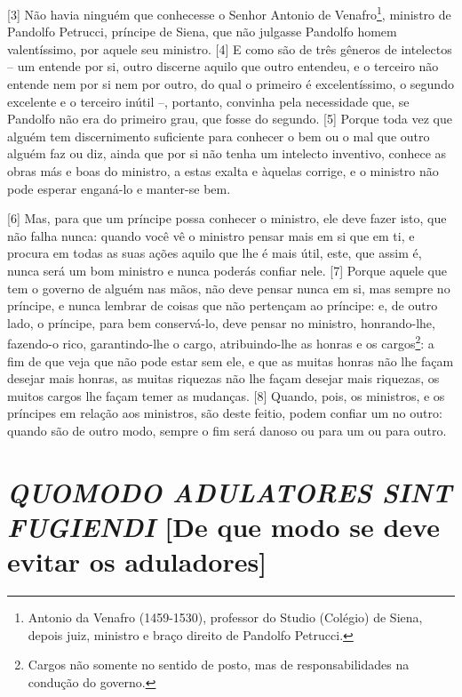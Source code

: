 {[}3{]} Não havia ninguém que conhecesse o Senhor Antonio de
Venafro\footnote{Antonio da Venafro (1459-1530), professor do Studio
  (Colégio) de Siena, depois juiz, ministro e braço direito de Pandolfo
  Petrucci.}, ministro de Pandolfo Petrucci, príncipe de Siena, que não
julgasse Pandolfo homem valentíssimo, por aquele seu ministro. {[}4{]} E
como são de três gêneros de intelectos -- um entende por si, outro
discerne aquilo que outro entendeu, e o terceiro não entende nem por si
nem por outro, do qual o primeiro é excelentíssimo, o segundo excelente
e o terceiro inútil --, portanto, convinha pela necessidade que, se
Pandolfo não era do primeiro grau, que fosse do segundo. {[}5{]} Porque
toda vez que alguém tem discernimento suficiente para conhecer o bem ou
o mal que outro alguém faz ou diz, ainda que por si não tenha um
intelecto inventivo, conhece as obras más e boas do ministro, a estas
exalta e àquelas corrige, e o ministro não pode esperar enganá-lo e
manter-se bem.

{[}6{]} Mas, para que um príncipe possa conhecer o ministro, ele deve
fazer isto, que não falha nunca: quando você vê o ministro pensar mais
em si que em ti, e procura em todas as suas ações aquilo que lhe é mais
útil, este, que assim é, nunca será um bom ministro e nunca poderás
confiar nele. {[}7{]} Porque aquele que tem o governo de alguém nas
mãos, não deve pensar nunca em si, mas sempre no príncipe, e nunca
lembrar de coisas que não pertençam ao príncipe: e, de outro lado, o
príncipe, para bem conservá-lo, deve pensar no ministro, honrando-lhe,
fazendo-o rico, garantindo-lhe o cargo, atribuindo-lhe as honras e os
cargos\footnote{Cargos não somente no sentido de posto, mas de
  responsabilidades na condução do governo.}: a fim de que veja que não
pode estar sem ele, e que as muitas honras não lhe façam desejar mais
honras, as muitas riquezas não lhe façam desejar mais riquezas, os
muitos cargos lhe façam temer as mudanças. {[}8{]} Quando, pois, os
ministros, e os príncipes em relação aos ministros, são deste feitio,
podem confiar um no outro: quando são de outro modo, sempre o fim será
danoso ou para um ou para outro.

\quebra\section{\emph{QUOMODO ADULATORES SINT FUGIENDI}
{[}De que modo se deve evitar os aduladores{]}}

